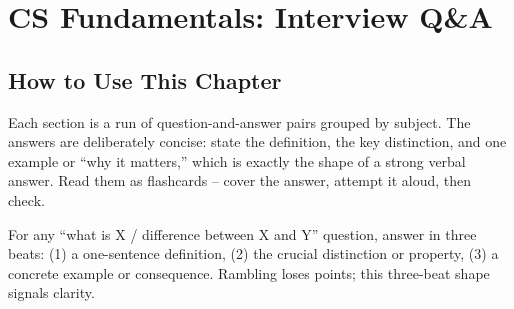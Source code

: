\chapter{CS Fundamentals: Interview Q\&A}

\section{How to Use This Chapter}
\label{sec:qna-intro}

Each section is a run of question-and-answer pairs grouped by subject. The
answers are deliberately concise: state the definition, the key
distinction, and one example or ``why it matters,'' which is exactly the
shape of a strong verbal answer. Read them as flashcards -- cover the
answer, attempt it aloud, then check.

\begin{ideabox}
For any ``what is X / difference between X and Y'' question, answer in
three beats: (1) a one-sentence definition, (2) the crucial distinction or
property, (3) a concrete example or consequence. Rambling loses points;
this three-beat shape signals clarity.
\end{ideabox}

\newpage





